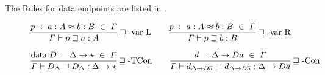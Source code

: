 The Rules for data endpoints are listed in .

\begin{figure}

\begin{align*}
  \frac{
  p\ :\ a:A\approx b:B\ \in\ \varGamma
}{
  \varGamma\vdash p\sqsupseteq a:A
  }\operatorname{\sqsupseteq-var-L} \quad & \quad \frac{
    p\ :\ a:A\approx b:B\ \in\ \varGamma
  }{
    \varGamma\vdash p\sqsupseteq b:B
    }\operatorname{\sqsupseteq-var-R} \\
\end{align*}

\begin{align*}
\frac{\mathsf{data}\ D\ :\ \Delta\rightarrow\star\ \in\ \varGamma
}{
\varGamma\vdash D_{\Delta}\sqsupseteq D_{\Delta}:\Delta\rightarrow\star
}\operatorname{\sqsupseteq-TCon} \quad & \quad \frac{
d\ :\ \Delta\rightarrow D\overline{a}\ \in\ \varGamma
}{
\varGamma\vdash d_{\Delta\rightarrow D\overline{a}}\sqsupseteq d_{\Delta\rightarrow D\overline{a}}:\Delta\rightarrow D\overline{a}
}\operatorname{\sqsupseteq-Con}\\
\end{align*}


\end{figure}
